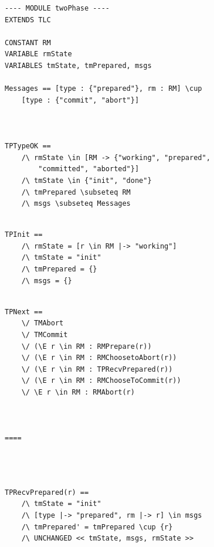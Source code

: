 \documentclass{beamer}
\begin{document}
\begin{frame}[fragile]
    \begin{lstlisting}
---- MODULE twoPhase ----
EXTENDS TLC

CONSTANT RM 
VARIABLE rmState 
VARIABLES tmState, tmPrepared, msgs 

Messages == [type : {"prepared"}, rm : RM] \cup 
    [type : {"commit", "abort"}]



TPTypeOK == 
    /\ rmState \in [RM -> {"working", "prepared", 
        "committed", "aborted"}]
    /\ tmState \in {"init", "done"}
    /\ tmPrepared \subseteq RM
    /\ msgs \subseteq Messages


    \end{lstlisting}
\end{frame}


\begin{frame}[fragile]
    \begin{lstlisting}
TPInit == 
    /\ rmState = [r \in RM |-> "working"]
    /\ tmState = "init"
    /\ tmPrepared = {}
    /\ msgs = {}

    \end{lstlisting}
\end{frame}



\begin{frame}[fragile]
    \begin{lstlisting}

TPNext ==
    \/ TMAbort
    \/ TMCommit
    \/ (\E r \in RM : RMPrepare(r))
    \/ (\E r \in RM : RMChoosetoAbort(r))
    \/ (\E r \in RM : TPRecvPrepared(r))
    \/ (\E r \in RM : RMChooseToCommit(r))
    \/ \E r \in RM : RMAbort(r)



====
    \end{lstlisting}


\end{frame}


\begin{frame}[fragile]
    \begin{lstlisting}



TPRecvPrepared(r) == 
    /\ tmState = "init"
    /\ [type |-> "prepared", rm |-> r] \in msgs
    /\ tmPrepared' = tmPrepared \cup {r}
    /\ UNCHANGED << tmState, msgs, rmState >>
        
    \end{lstlisting}


\end{frame}
\end{document}

